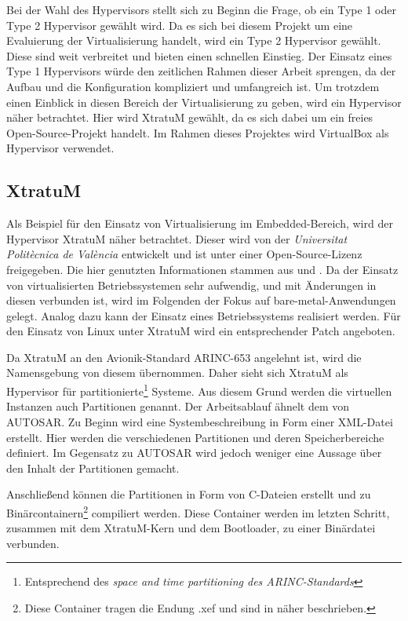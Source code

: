 \documentclass[
  a4paper,					    %
  twoside,
  DIV=calc,     				%
  bibliography=totoc,
  cleardoublepage=empty,
  ngerman,     					%
  final       					%
]{scrbook}
\begin{document}
Bei der Wahl des Hypervisors stellt sich zu Beginn die Frage, ob ein Type 1 oder Type 2 Hypervisor gewählt wird. Da es sich bei diesem Projekt um eine Evaluierung der Virtualisierung handelt, wird ein Type 2 Hypervisor gewählt. Diese sind weit verbreitet und bieten einen schnellen Einstieg. Der Einsatz eines Type 1 Hypervisors würde den zeitlichen Rahmen dieser Arbeit sprengen, da der Aufbau und die Konfiguration kompliziert und umfangreich ist. Um trotzdem einen Einblick in diesen Bereich der Virtualisierung zu geben, wird ein Hypervisor näher betrachtet. Hier wird XtratuM gewählt, da es sich dabei um ein freies Open-Source-Projekt handelt. Im Rahmen dieses Projektes wird VirtualBox als Hypervisor verwendet.

\subsection{XtratuM}
\label{sec:xtratum}
Als Beispiel für den Einsatz von Virtualisierung im Embedded-Bereich, wird der Hypervisor XtratuM näher betrachtet. Dieser wird von der \emph{Universitat Politècnica de València} entwickelt und ist unter einer Open-Source-Lizenz freigegeben. Die hier genutzten Informationen stammen aus \cite{xm:usermanual} und \cite{xm:reference}. Da der Einsatz von virtualisierten Betriebssystemen sehr aufwendig, und mit Änderungen in diesen verbunden ist, wird im Folgenden der Fokus auf bare-metal-Anwendungen gelegt. Analog dazu kann der Einsatz eines Betriebssystems realisiert werden. Für den Einsatz von Linux unter XtratuM wird ein entsprechender Patch angeboten.

Da XtratuM an den Avionik-Standard ARINC-653 angelehnt ist, wird die Namensgebung von diesem übernommen. Daher sieht sich XtratuM als Hypervisor für partitionierte\footnote{Entsprechend des \emph{space and time partitioning des ARINC-Standards}} Systeme. Aus diesem Grund werden die virtuellen Instanzen auch Partitionen genannt. Der Arbeitsablauf ähnelt dem von AUTOSAR. Zu Beginn wird eine Systembeschreibung in Form einer XML-Datei erstellt. Hier werden die verschiedenen Partitionen und deren Speicherbereiche definiert. Im Gegensatz zu AUTOSAR wird jedoch weniger eine Aussage über den Inhalt der Partitionen gemacht.

Anschließend können die Partitionen in Form von C-Dateien erstellt und zu Binärcontainern\footnote{Diese Container tragen die Endung .xef und sind in \cite[Seite 68]{xm:usermanual} näher beschrieben.} compiliert werden. Diese Container werden im letzten Schritt, zusammen mit dem XtratuM-Kern und dem Bootloader, zu einer Binärdatei verbunden.
\end{document}
